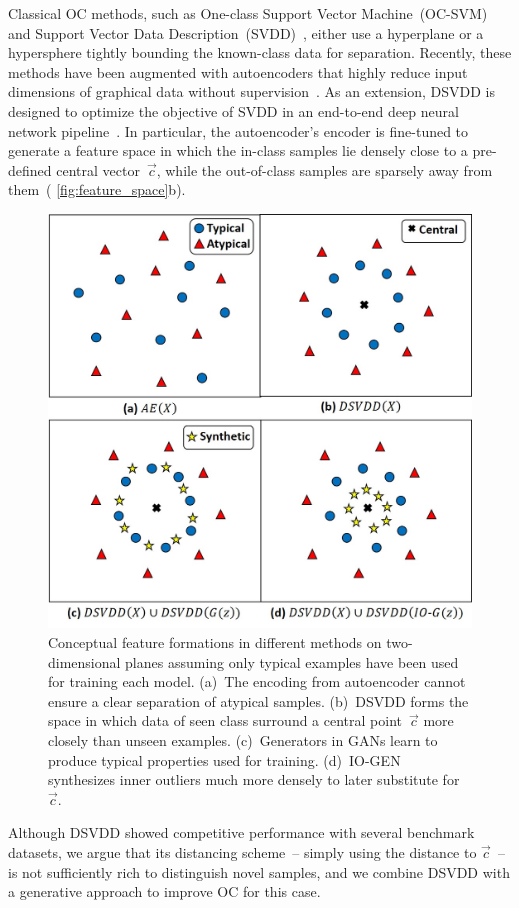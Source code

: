 \documentclass[letterpaper]{article} %
\let\orgautoref\autoref
\renewcommand{\autoref}
{\def\equationautorefname{Equation}%
	\def\figureautorefname{Fig.}%
	\def\subfigureautorefname{Fig.}%
	\def\Itemautorefname{item}%
	\def\tableautorefname{Table}%
	\def\exerciseautorefname{Exercise}%
	\def\starexerciseautorefname{Exercise}%
	\def\sectionautorefname{Section}%
	\def\subsectionautorefname{Section}%
	\def\subsubsectionautorefname{Section}%
	\def\chapterautorefname{Section}%
	\def\partautorefname{Part}%
	\orgautoref}
\begin{document}
Classical OC methods, such as One-class Support Vector
Machine~(OC-SVM)~\citep{SPSSW01} and Support Vector Data
Description~(SVDD)~\citep{TD04}, either use a hyperplane or a
hypersphere tightly bounding the known-class data for separation.
Recently, these methods have been augmented with autoencoders that
highly reduce input dimensions of graphical data without
supervision~\citep{XRYSS15, RGLL20}. As an extension, DSVDD is designed
to optimize the objective of SVDD in an end-to-end deep neural network
pipeline~\citep{RVGDSBMK18}. In particular, the autoencoder's encoder is
fine-tuned to generate a feature space in which the in-class
samples lie densely close to a pre-defined central vector~$\vec{c}$,
while the out-of-class samples are sparsely away from
them~(\autoref{fig:feature_space}b).
\begin{figure}\centering
	\includegraphics[width=.7\linewidth]{feature_space}
	\caption{
        Conceptual feature formations in different methods on
        two-dimensional planes assuming only typical examples have been
        used for training each model.
        (a)~The encoding from autoencoder cannot ensure a clear
        separation of atypical samples.
        (b)~DSVDD forms the space in which data of seen class surround a
        central point~$\vec{c}$ more closely than unseen examples.
        (c)~Generators in GANs learn to produce typical properties used
        for training.
        (d)~\mbox{IO-GEN} synthesizes inner outliers much more densely to later
        substitute for~$\vec{c}$.
	}
	\label{fig:feature_space}
\end{figure}
Although DSVDD showed competitive performance with several benchmark
datasets, we argue that its distancing scheme~-- simply using the
distance to $\vec{c}$~-- is not sufficiently rich to distinguish novel
samples, and we combine DSVDD with a generative approach to improve OC
for this case.
\end{document}
